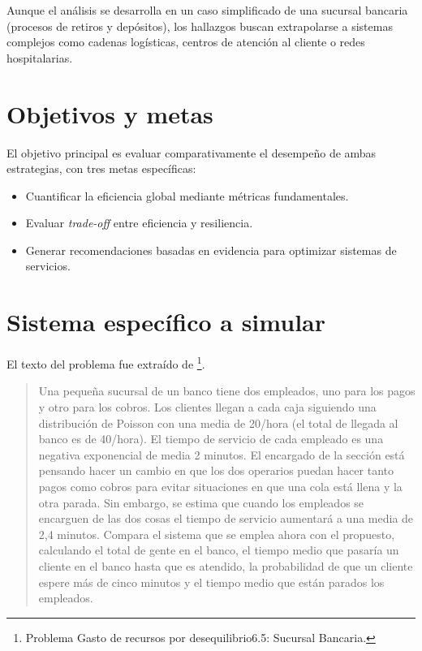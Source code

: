 \documentclass[letterpaper, 12pt]{report}
\begin{document}
Aunque el análisis se desarrolla en un caso simplificado de una sucursal bancaria (procesos de retiros y depósitos), los hallazgos buscan extrapolarse a sistemas complejos como cadenas logísticas, centros de atención al cliente o redes hospitalarias.

\section{Objetivos y metas}
El objetivo principal es evaluar comparativamente el desempeño de ambas estrategias, con tres metas específicas:

\begin{itemize}
    \item[1.] Cuantificar la eficiencia global mediante métricas fundamentales.  
    \item[2.] Evaluar \textit{trade-off}  entre eficiencia y resiliencia.
    \item[3.] Generar recomendaciones basadas en evidencia para optimizar sistemas de servicios.
\end{itemize}


\section{Sistema específico a simular}

El texto del problema fue extraído de \cite{sabater2015} \footnote{Problema Gasto de recursos por desequilibrio6.5: Sucursal Bancaria.}.

\begin{quote}
    Una pequeña sucursal de un banco tiene dos empleados, uno para los pagos y otro para los cobros. Los clientes llegan a 
cada caja siguiendo una distribución de Poisson con una media de 20/hora (el total de llegada al banco es de 40/hora). 
El tiempo de servicio de cada empleado es una negativa exponencial de media 2 minutos. El encargado de la sección está 
pensando hacer un cambio en que los dos operarios puedan hacer tanto pagos como cobros para evitar situaciones en que 
una cola está llena y la otra parada. Sin embargo, se estima que cuando los empleados se encarguen de las dos cosas 
el tiempo de servicio aumentará a una media de 2,4 minutos. Compara el sistema que se emplea ahora con el propuesto, 
calculando el total de gente en el banco, el tiempo medio que pasaría un cliente en el banco hasta que es atendido, 
la probabilidad de que un cliente espere más de cinco minutos y el tiempo medio que están parados los empleados. 
\end{quote}
\end{document}
